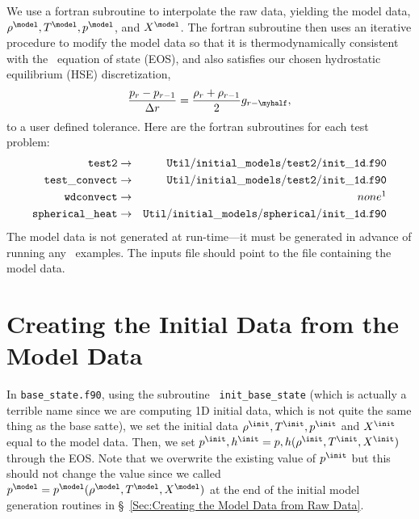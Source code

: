 We use a fortran subroutine
to interpolate the raw data, yielding the model data, $\rho^{\model},
T^{\model}, p^{\model}$, and $X^{\model}$.  The fortran subroutine
then uses an iterative procedure to modify the model data so that it
is thermodynamically consistent with the \maestro\ equation of
state (EOS), and also satisfies our chosen hydrostatic equilibrium
(HSE) discretization,
\begin{equation}
\frac{p_r - p_{r-1}}{\Delta r} = \frac{\rho_r + \rho_{r-1}}{2}g_{r-\myhalf},\label{HSE Discretization}
\end{equation}
to a user defined tolerance.  Here are the fortran subroutines for each test problem:
\begin{eqnarray}
{\tt test2} & \rightarrow & {\tt Util/initial\_models/test2/init\_1d.f90} \nonumber \\
{\tt test\_convect} & \rightarrow & {\tt Util/initial\_models/test2/init\_1d.f90} \nonumber \\
{\tt wdconvect} & \rightarrow & none\footnotemark \nonumber \\
{\tt spherical\_heat} & \rightarrow & {\tt Util/initial\_models/spherical/init\_1d.f90} \nonumber \\
\end{eqnarray}
The model data is not generated at run-time---it must be generated in
advance of running any \maestro\ examples.  The inputs file should point
to the file containing the model data.

\section{Creating the Initial Data from the Model Data}
In {\tt base\_state.f90}, using the subroutine {\tt
  init\_base\_state} (which is actually a terrible name since we
are computing 1D initial data, which is not quite the same thing 
as the base satte), we set the initial
data $\rho^{\init}, T^{\init}, p^{\init}$ and $X^{\init}$ equal to the
model data.  Then, we set $p^{\init},h^{\init} =
p,h(\rho^{\init},T^{\init},X^{\init})$ through the EOS.  Note that 
we overwrite the existing value of $p^{\init}$ but this should not change
the value since we called 
$p^{\model} = p^{\model}(\rho^{\model},T^{\model},X^{\model})$ at the end of the
initial model generation routines in 
\S~\ref{Sec:Creating the Model Data from Raw Data}.

